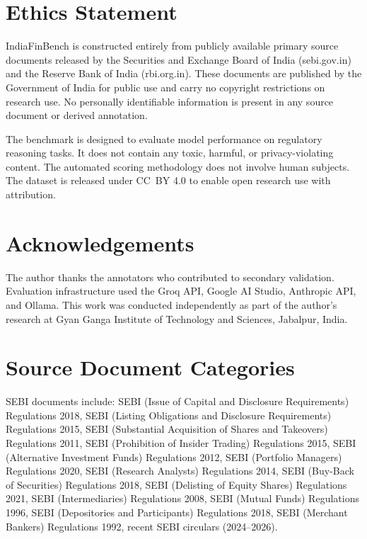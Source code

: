 \documentclass[11pt]{article}
\begin{document}
\section*{Ethics Statement}

IndiaFinBench is constructed entirely from publicly available primary source
documents released by the Securities and Exchange Board of India (sebi.gov.in)
and the Reserve Bank of India (rbi.org.in). These documents are published by
the Government of India for public use and carry no copyright restrictions on
research use. No personally identifiable information is present in any source
document or derived annotation.

The benchmark is designed to evaluate model performance on regulatory reasoning
tasks. It does not contain any toxic, harmful, or privacy-violating content.
The automated scoring methodology does not involve human subjects. The dataset
is released under CC~BY 4.0 to enable open research use with attribution.

\section*{Acknowledgements}

The author thanks the annotators who contributed to secondary validation.
Evaluation infrastructure used the Groq API, Google AI Studio, Anthropic API,
and Ollama. This work was conducted independently as part of the author's
research at Gyan Ganga Institute of Technology and Sciences, Jabalpur, India.




\appendix

\section{Source Document Categories}
\label{app:sources}

SEBI documents include: SEBI (Issue of Capital and Disclosure Requirements)
Regulations 2018, SEBI (Listing Obligations and Disclosure Requirements)
Regulations 2015, SEBI (Substantial Acquisition of Shares and Takeovers)
Regulations 2011, SEBI (Prohibition of Insider Trading) Regulations 2015,
SEBI (Alternative Investment Funds) Regulations 2012, SEBI (Portfolio Managers)
Regulations 2020, SEBI (Research Analysts) Regulations 2014, SEBI (Buy-Back of
Securities) Regulations 2018, SEBI (Delisting of Equity Shares) Regulations
2021, SEBI (Intermediaries) Regulations 2008, SEBI (Mutual Funds) Regulations
1996, SEBI (Depositories and Participants) Regulations 2018, SEBI (Merchant
Bankers) Regulations 1992, recent SEBI circulars (2024--2026).
\end{document}
